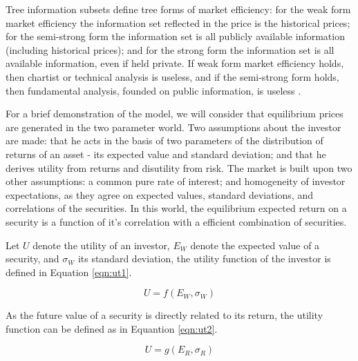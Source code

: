 \documentclass[cic,tc, english]{iiufrgs}
\begin{document}
    \begin{comment}
        providing accurate signals for resource allocation. Prices should reflect information as it reflects the forecasts of future prices, which should be revised with the arrival of new information.
    \end{comment}

    Tree information subsets define tree forms of market efficiency: for the weak form market efficiency the information set reflected in the price is the historical prices; for the semi-strong form the information set is all publicly available information (including historical prices); and for the strong form the information set is all available information, even if held private. If weak form market efficiency holds, then chartist or technical analysis is useless, and if the semi-strong form holds, then fundamental analysis, founded on public information, is useless \citet{oprean2012}.

    For a brief demonstration of the model, we will consider that equilibrium prices are generated in the two parameter \citet{sharpe1964} world. Two assumptions about the investor are made: that he acts in the basis of two parameters of the distribution of returns of an asset - its expected value and standard deviation; and that he derives utility from returns and disutility from risk. The market is built upon two other assumptions: a common pure rate of interest; and homogeneity of investor expectations, as they agree on expected values, standard deviations, and correlations of the securities. In this world, the equilibrium expected return on a security is a function of it's correlation with a efficient combination of securities.
    
    Let $U$ denote the utility of an investor, $E_W$ denote the expected value of a security, and $\sigma_W$ its standard deviation, the utility function of the investor is defined in Equation \ref{eqn:ut1}.
    
    \begin{equation}
        \label{eqn:ut1}
        U = f(E_W, \sigma_W)
    \end{equation}
    
    As the future value of a security is directly related to its return, the utility function can be defined as in Equantion \ref{eqn:ut2}.

    \begin{equation}
        \label{eqn:ut2}
        U = g(E_R, \sigma_R)
    \end{equation}
\end{document}
